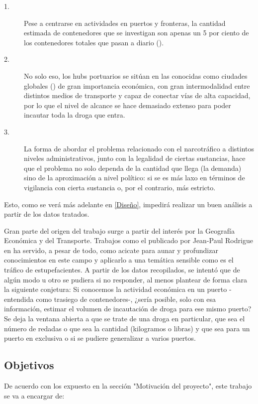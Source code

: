 \documentclass[12pt]{article}
\begin{document}
	\begin{description}
		\item[1.] Pese a centrarse en actividades en puertos y fronteras, la cantidad estimada de contenedores que se investigan son apenas un 5 por ciento de los contenedores totales que pasan a diario (\cite{rodrigue2024geography}).
		\item[2.] No solo eso, los hubs portuarios se sitúan en las conocidas como ciudades globales (\cite{rodrigue2024geography}) de gran importancia económica, con gran intermodalidad entre distintos medios de transporte y capaz de conectar vías de alta capacidad, por lo que el nivel de alcance se hace demasiado extenso para poder incautar toda la droga que entra.
		\item[3.] La forma de abordar el problema relacionado con el narcotráfico a distintos niveles administrativos, junto con la legalidad de ciertas sustancias, hace que el problema no solo dependa de la cantidad que llega (la demanda) sino de la aproximación a nivel político: si se es más laxo en términos de vigilancia con cierta sustancia o, por el contrario, más estricto.
	\end{description}
	
	Esto, como se verá más adelante en \ref{Diseño}, impedirá realizar un buen análisis a partir de los datos tratados.
	
	Gran parte del origen del trabajo surge a partir del interés por la Geografía Económica y del Transporte. Trabajos como el publicado por Jean-Paul Rodrigue en \cite{rodrigue2024geography} ha servido, a pesar de todo, como acicate para aunar y profundizar conocimientos en este campo y aplicarlo a una temática sensible como es el tráfico de estupefacientes. A partir de los datos recopilados, se intentó que de algún modo u otro se pudiera si no responder, al menos plantear de forma clara la siguiente conjetura: Si conocemos la actividad económica en un puerto -entendida como trasiego de contenedores-, ¿sería posible, solo con esa información, estimar el volumen de incautación de droga para ese mismo puerto? Se deja la ventana abierta a que se trate de una droga en particular, que sea el número de redadas o que sea la cantidad (kilogramos o libras) y que sea para un puerto en exclusiva o si se pudiere generalizar a varios puertos.
	 
	\subsection{Objetivos}
	De acuerdo con los expuesto en la sección "Motivación del proyecto", este trabajo se va a encargar de:
	
\end{document}
